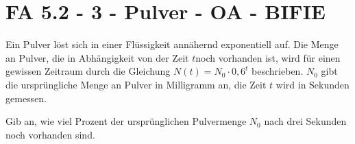 \section{FA 5.2 - 3 - Pulver - OA - BIFIE}

\begin{beispiel}[FA 5.2]{1} %
Ein Pulver löst sich in einer Flüssigkeit annähernd exponentiell auf. Die Menge an Pulver, die in
Abhängigkeit von der Zeit $t $noch vorhanden ist, wird für einen gewissen Zeitraum durch die
Gleichung $N(t) = N_0 \cdot 0,6^t$ beschrieben. $N_0$ gibt die ursprüngliche Menge an Pulver in Milligramm
an, die Zeit $t$ wird in Sekunden gemessen. 

\leer

Gib an, wie viel Prozent der ursprünglichen Pulvermenge $N_0$ nach drei Sekunden noch vorhanden sind.  

\end{beispiel}